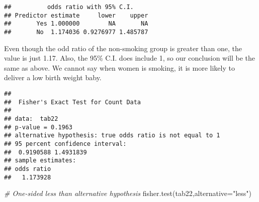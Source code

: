 \documentclass[
]{article}
\newenvironment{Shaded}{\begin{snugshade}}{\end{snugshade}}
\newcommand{\AttributeTok}[1]{\textcolor[rgb]{0.77,0.63,0.00}{#1}}
\newcommand{\CommentTok}[1]{\textcolor[rgb]{0.56,0.35,0.01}{\textit{#1}}}
\newcommand{\FunctionTok}[1]{\textcolor[rgb]{0.00,0.00,0.00}{#1}}
\newcommand{\NormalTok}[1]{#1}
\newcommand{\OtherTok}[1]{\textcolor[rgb]{0.56,0.35,0.01}{#1}}
\newcommand{\SpecialCharTok}[1]{\textcolor[rgb]{0.00,0.00,0.00}{#1}}
\newcommand{\StringTok}[1]{\textcolor[rgb]{0.31,0.60,0.02}{#1}}
\begin{document}
\begin{Shaded}
\end{Shaded}

\begin{verbatim}
##          odds ratio with 95% C.I.
## Predictor estimate     lower    upper
##       Yes 1.000000        NA       NA
##       No  1.174036 0.9276977 1.485787
\end{verbatim}

Even though the odd ratio of the non-smoking group is greater than one,
the value is just 1.17. Also, the 95\% C.I. does include 1, so our
conclusion will be the same as above. We cannot say when women is
smoking, it is more likely to deliver a low birth weight baby.

\begin{Shaded}
\end{Shaded}

\begin{verbatim}
## 
##  Fisher's Exact Test for Count Data
## 
## data:  tab22
## p-value = 0.1963
## alternative hypothesis: true odds ratio is not equal to 1
## 95 percent confidence interval:
##  0.9190588 1.4931839
## sample estimates:
## odds ratio 
##   1.173928
\end{verbatim}

\begin{Shaded}
\begin{Highlighting}[]
\CommentTok{\# One{-}sided less than alternative hypothesis}
\FunctionTok{fisher.test}\NormalTok{(tab22,}\AttributeTok{alternative=}\StringTok{"less"}\NormalTok{)}
\end{Highlighting}
\end{Shaded}
\end{document}
